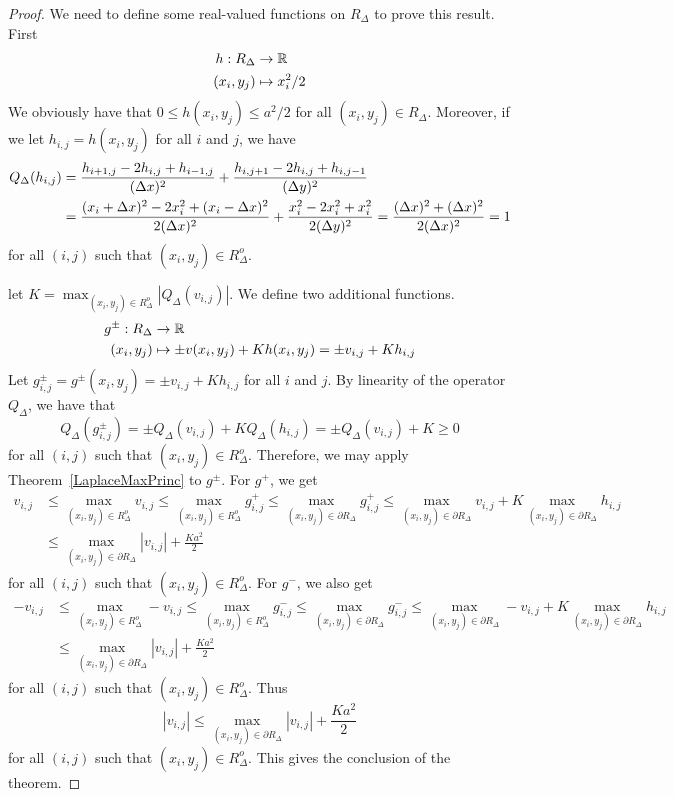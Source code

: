 \begin{proof}
We need to define some real-valued functions on $R_\Delta$ to prove
this result.  First
\begin{align*}
  h : R_\Delta & \to \mathbb{R} \\
  (x_i,y_j) & \mapsto x_i^2/2
\end{align*}
We obviously have that $0 \leq h(x_i,y_j) \leq a^2/2$ for all
$(x_i,y_j) \in R_\Delta$.  Moreover, if we let $h_{i,j} = h(x_i,y_j)$
for all $i$ and $j$, we have
\begin{align*}
  Q_\Delta(h_{i,j})
&= \frac{h_{i+1,j} - 2h_{i,j} + h_{i-1,j}}{(\Delta{x})^2}
+ \frac{h_{i,j+1} - 2h_{i,j} + h_{i,j-1}}{(\Delta{y})^2} \\
&= \frac{(x_i+\Delta{x})^2 - 2x_i^2 + (x_i-\Delta{x})^2}{2(\Delta{x})^2}
+ \frac{x_i^2 - 2x_i^2 + x_i^2}{2(\Delta{y})^2}
= \frac{(\Delta{x})^2 + (\Delta{x})^2}{2(\Delta{x})^2}
= 1
\end{align*}
for all $(i,j)$ such that $(x_i,y_j) \in R^o_\Delta$.

let
$\displaystyle
K = \max_{(x_i,y_j) \in R^o_\Delta} \left| Q_\Delta(v_{i,j})\right|$.
We define two additional functions.
\begin{align*}
  g^{\pm} : R_\Delta & \to \mathbb{R} \\
  (x_i,y_j) & \mapsto \pm v(x_i,y_j) + K h(x_i,y_j) = \pm v_{i,j} + K h_{i,j}
\end{align*}
Let $g_{i,j}^{\pm} = g^{\pm}(x_i,y_j) = \pm v_{i,j} + K h_{i,j}$ for
all $i$ and $j$.  By linearity of the operator $Q_\Delta$, we
have that
\[
Q_\Delta\left(g_{i,j}^{\pm}\right)
= \pm Q_\Delta(v_{i,j}) + K Q_\Delta(h_{i,j})
= \pm Q_\Delta(v_{i,j}) + K \geq 0
\]
for all $(i,j)$ such that $(x_i,y_j) \in R^o_\Delta$.
Therefore, we may apply Theorem~\ref{LaplaceMaxPrinc} to $g^{\pm}$.  For
$g^+$, we get
\begin{align*}
v_{i,j} & \leq \max_{(x_i,y_j) \in R^o_\Delta} v_{i,j}
\leq \max_{(x_i,y_j) \in R^o_\Delta} g^+_{i,j}
\leq \max_{(x_i,y_j) \in \partial R_\Delta} g^+_{i,j}
\leq \max_{(x_i,y_j) \in \partial R_\Delta} v_{i,j}
+ K \max_{(x_i,y_j) \in \partial R_\Delta} h_{i,j} \\
&\leq \max_{(x_i,y_j) \in \partial R_\Delta} |v_{i,j}| + \frac{K a^2}{2}
\end{align*}
for all $(i,j)$ such that $(x_i,y_j) \in R^o_\Delta$.
For $g^-$, we also get
\begin{align*}
-v_{i,j} & \leq \max_{(x_i,y_j) \in R^o_\Delta} -v_{i,j}
\leq \max_{(x_i,y_j) \in R^o_\Delta} g^-_{i,j}
\leq \max_{(x_i,y_j) \in \partial R_\Delta} g^-_{i,j}
\leq \max_{(x_i,y_j) \in \partial R_\Delta} -v_{i,j}
+ K \max_{(x_i,y_j) \in \partial R_\Delta} h_{i,j} \\
&\leq \max_{(x_i,y_j) \in \partial R_\Delta} |v_{i,j}| + \frac{K a^2}{2}
\end{align*}
for all $(i,j)$ such that $(x_i,y_j) \in R^o_\Delta$.
Thus
\[
|v_{i,j}| \leq \max_{(x_i,y_j) \in \partial R_\Delta} |v_{i,j}| + \frac{K a^2}{2}
\]
for all $(i,j)$ such that $(x_i,y_j) \in R^o_\Delta$.  This
gives the conclusion of the theorem.
\end{proof}

